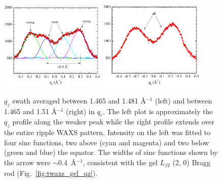 \begin{figure}[htbp]
  \centering
  \includegraphics[width=0.45\textwidth]{figures/ripple/tWAXS/twaxs_weak_qz}
  \includegraphics[width=0.45\textwidth]{figures/ripple/tWAXS/twaxs_both_qz}
  \caption{$q_z$ swath averaged between 1.465 and 1.481 \AA$^{-1}$
  (left) and between 1.465 and 1.51 \AA$^{-1}$ (right) in $q_r$.
  The left plot is approximately the $q_z$ profile along the weaker peak
  while the right profile extends over the entire ripple WAXS pattern.
  Intensity on the left was fitted to four sinc functions, two above
  (cyan and magenta) and two below (green and blue) the equator.
  The widths of sinc functions shown by the arrow were $\sim$0.4~\AA$^{-1}$,
  consistent with the gel $L_{\beta I}$ (2, 0) Bragg rod 
  (Fig.~\ref{fig:twaxs_gel_qz}).}
  \label{fig:twaxs_qzplot}
\end{figure}  


